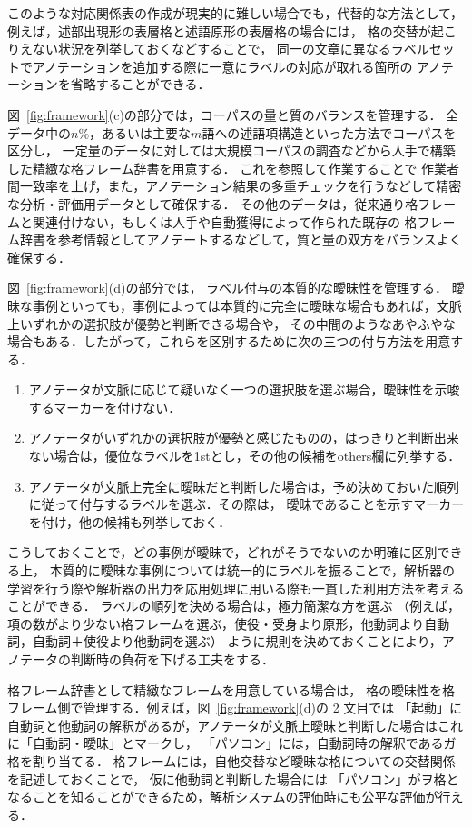 \documentclass[japanese]{jnlp_1.4}
\begin{document}
このような対応関係表の作成が現実的に難しい場合でも，代替的な方法として，
例えば，述部出現形の表層格と述語原形の表層格の場合には，
格の交替が起こりえない状況を列挙しておくなどすることで，
同一の文章に異なるラベルセットでアノテーションを追加する際に一意にラベルの対応が取れる箇所の
アノテーションを省略することができる．

図~\ref{fig:framework}(c)の部分では，コーパスの量と質のバランスを管理する．
全データ中の$n\%$，あるいは主要な$m$語への述語項構造といった方法でコーパスを区分し，
一定量のデータに対しては大規模コーパスの調査などから人手で構築した精緻な格フレーム辞書を用意する．
これを参照して作業することで
作業者間一致率を上げ，また，アノテーション結果の多重チェックを行うなどして精密な分析・評価用データとして確保する．
その他のデータは，従来通り格フレームと関連付けない，もしくは人手や自動獲得によって作られた既存の
格フレーム辞書を参考情報としてアノテートするなどして，質と量の双方をバランスよく確保する．

図~\ref{fig:framework}(d)の部分では，
ラベル付与の本質的な曖昧性を管理する．
曖昧な事例といっても，事例によっては本質的に完全に曖昧な場合もあれば，文脈上いずれかの選択肢が優勢と判断できる場合や，
その中間のようなあやふやな場合もある．したがって，これらを区別するために次の三つの付与方法を用意する．
\begin{enumerate}
\item アノテータが文脈に応じて疑いなく一つの選択肢を選ぶ場合，曖昧性を示唆するマーカーを付けない．
\item アノテータがいずれかの選択肢が優勢と感じたものの，はっきりと判断出来ない場合は，優位なラベルを1stとし，その他の候補をothers欄に列挙する．
\item アノテータが文脈上完全に曖昧だと判断した場合は，予め決めておいた順列に従って付与するラベルを選ぶ．その際は，
曖昧であることを示すマーカーを付け，他の候補も列挙しておく．
\end{enumerate}
こうしておくことで，どの事例が曖昧で，どれがそうでないのか明確に区別できる上，
本質的に曖昧な事例については統一的にラベルを振ることで，解析器の学習を行う際や解析器の出力を応用処理に用いる際も一貫した利用方法を考えることができる．
ラベルの順列を決める場合は，極力簡潔な方を選ぶ
（例えば，項の数がより少ない格フレームを選ぶ，使役・受身より原形，他動詞より自動詞，自動詞＋使役より他動詞を選ぶ）
ように規則を決めておくことにより，アノテータの判断時の負荷を下げる工夫をする．

格フレーム辞書として精緻なフレームを用意している場合は，
格の曖昧性を格フレーム側で管理する．例えば，図~\ref{fig:framework}(d)の 2 文目では
「起動」に自動詞と他動詞の解釈があるが，アノテータが文脈上曖昧と判断した場合はこれに「自動詞・曖昧」とマークし，
「パソコン」には，自動詞時の解釈であるガ格を割り当てる．
格フレームには，自他交替など曖昧な格についての交替関係を記述しておくことで，
仮に他動詞と判断した場合には
「パソコン」がヲ格となることを知ることができるため，解析システムの評価時にも公平な評価が行える．
\end{document}
